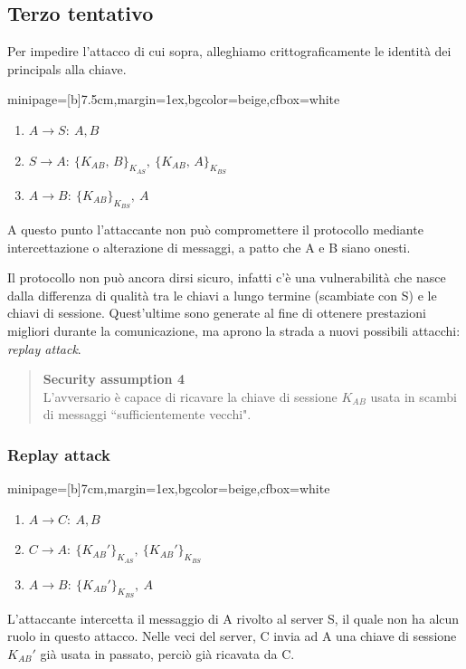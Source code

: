 \documentclass[a4paper, 11pt, twoside, openright, fleqn]{report}
\newcommand{\fromto}[2]{#1\rightarrow #2\!:\ }
\newenvironment{colbox}[2]%
{%
	\par\noindent\hspace{10pt}
	\begin{adjustbox}{minipage=[b]{#2},margin=1ex,bgcolor=#1,cfbox=white}
}{%
	\end{adjustbox}\newline%
}
\begin{document}
\subsection{Terzo tentativo}
Per impedire l'attacco di cui sopra, alleghiamo crittograficamente le identità dei principals alla chiave.
\begin{colbox}{beige}{7.5cm}
	\begin{enumerate}
		\item $\fromto{A}{S}A, B$
		\item $\fromto{S}{A}\{K_{AB},\,B\}_{K_{AS}},\ \{K_{AB},\,A\}_{K_{BS}}$
		\item $\fromto{A}{B}\{K_{AB}\}_{K_{BS}},\ A$
	\end{enumerate}
\end{colbox}
A questo punto l'attaccante non può compromettere il protocollo mediante intercettazione o alterazione di messaggi, a patto che A e B siano onesti.

Il protocollo non può ancora dirsi sicuro, infatti c'è una vulnerabilità che nasce dalla differenza di qualità tra le chiavi a lungo termine (scambiate con S) e le chiavi di sessione. Quest'ultime sono generate al fine di ottenere prestazioni migliori durante la comunicazione, ma aprono la strada a nuovi possibili attacchi: \emph{replay attack}.
\begin{quote}
	\textbf{Security assumption 4}\\
	L'avversario è capace di ricavare la chiave di sessione $K_{AB}$ usata in scambi di messaggi ``sufficientemente vecchi".
\end{quote}

\subsubsection{Replay attack}
\begin{colbox}{beige}{7cm}
	\begin{enumerate}
		\item $\fromto{A}{C}A, B$
		\item $\fromto{C}{A}\{K_{AB}'\}_{K_{AS}},\ \{K_{AB}'\}_{K_{BS}}$
		\item $\fromto{A}{B}\{K_{AB}'\}_{K_{BS}},\ A$
	\end{enumerate}
\end{colbox}
L'attaccante intercetta il messaggio di A rivolto al server S, il quale non ha alcun ruolo in questo attacco. Nelle veci del server, C invia ad A una chiave di sessione $K_{AB}'$ già usata in passato, perciò già ricavata da C.
\end{document}
